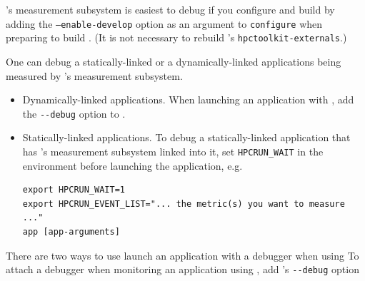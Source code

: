 \documentclass[11pt,twoside,letterpaper]{report}
\begin{document}
\HPCToolkit{}'s measurement subsystem is easiest to debug if you configure and
build \HPCToolkit{} by adding the \texttt{--enable-develop} option as an argument to \texttt{configure} when preparing to build \HPCToolkit{}.
(It is not necessary to rebuild \HPCToolkit{}'s \verb|hpctoolkit-externals|.)
%

One can debug a statically-linked or a dynamically-linked applications being measured by
\HPCToolkit{}'s measurement subsystem.
\begin{itemize}
\item Dynamically-linked applications. When launching an application with \hpcrun{}, add the \verb|--debug| option to \hpcrun{}.
\item Statically-linked applications. To debug a statically-linked application that has \HPCToolkit{}'s measurement subsystem linked into it, set \verb|HPCRUN_WAIT| in the environment before launching the application, e.g.
\begin{verbatim}
export HPCRUN_WAIT=1
export HPCRUN_EVENT_LIST="... the metric(s) you want to measure ..."
app [app-arguments]
\end{verbatim}
\end{itemize}

There are two ways to use launch an application with a debugger when using
To attach a debugger when monitoring an application using \hpcrun{}, add \hpcrun{}'s \verb|--debug| option
\end{document}
